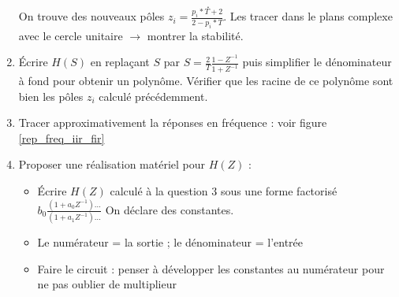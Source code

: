 \documentclass[9pt]{article}
\begin{document}
\begin{multicols}{2}
\begin{enumerate}
\[    .\]
    On trouve des nouveaux pôles $ z_i = \frac{p_i*T + 2}{2 - p_i *T} $. Les tracer dans le plans complexe avec le cercle unitaire $\rightarrow$ montrer la stabilité.
    \item Écrire $ H(S) $ en replaçant $ S $ par $ S = \frac{2}{T} \frac{1 - Z^{-1}}{1 + Z^{-1}} $ puis simplifier le dénominateur à fond pour obtenir un polynôme. Vérifier que les racine de ce polynôme sont bien les pôles $ z_i $ calculé précédemment.
    \item Tracer approximativement la réponses en fréquence : voir figure \ref{rep_freq_iir_fir}
    \item Proposer une réalisation matériel pour $ H(Z) $ : 
        \begin{itemize}
            \item Écrire $ H(Z) $ calculé à la question 3 sous une forme factorisé $ b_0 \frac{(1+ a_0 Z^{-1})\dots}{(1 + a_1 Z^{-1})\dots} $ On déclare des constantes. 
            \item Le numérateur = la sortie ; le dénominateur = l'entrée
            \item Faire le circuit : penser à développer les constantes au numérateur pour ne pas oublier de multiplieur
        \end{itemize}
\end{enumerate}


\end{multicols}
\end{document}
